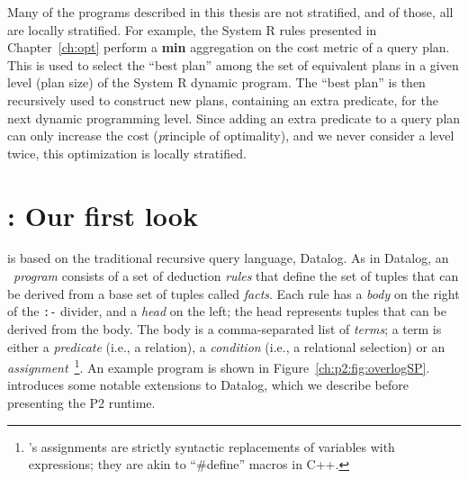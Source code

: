 Many of the programs described in this thesis are not stratified, and of those,
all are locally stratified.  For example, the System R rules presented in
Chapter~\ref{ch:opt} perform a {\bf min} aggregation on the cost metric of a
query plan.  This is used to select the ``best plan'' among the set of
equivalent plans in a given level (plan size) of the System R dynamic program.
The ``best plan'' is then recursively used to construct new plans, containing
an extra predicate, for the next dynamic programming level.  Since adding an
extra predicate to a query plan can only increase the cost ({\emph principle of
optimality}), and we never consider a level twice, this optimization is locally
stratified.


\section{\OVERLOG: Our first look}
\label{ch:p2:sec:overlog}

\OVERLOG is based on the traditional recursive query language, Datalog.  As in
Datalog, an \OVERLOG~{\em program} consists of a set of deduction {\em rules}
that define the set of tuples that can be derived from a base set of tuples
called {\em facts}.  Each rule has a {\em body} on the right of the \texttt{:-}
divider, and a {\em head} on the left; the head represents tuples that can be
derived from the body.  The body is a comma-separated list of {\em terms}; a
term is either a {\em predicate} (i.e., a relation), a {\em condition} (i.e., a
relational selection) or an {\em assignment}~\footnote{\OVERLOG's assignments
are strictly syntactic replacements of variables with expressions; they are
akin to ``\#define'' macros in C++.}.  An example \OVERLOG program is shown in
Figure~\ref{ch:p2:fig:overlogSP}.  \OVERLOG introduces some notable extensions
to Datalog, which we describe before presenting the P2 runtime.

